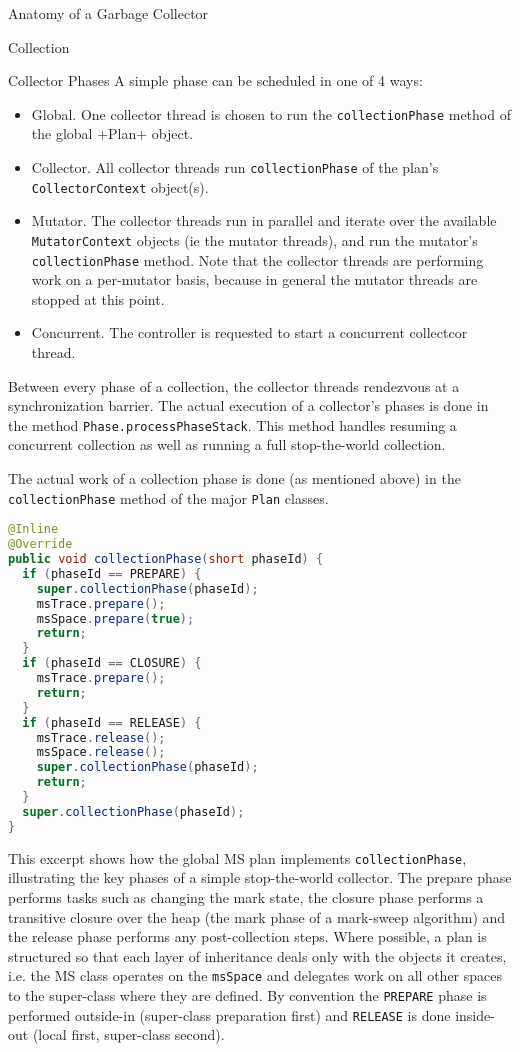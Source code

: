 \begin{section}{Anatomy of a Garbage Collector}
\begin{subsection}{Collection}
\begin{subsubsection}{Collector Phases}
A simple phase can be scheduled in one of 4 ways: 
\begin{itemize}
  \item Global.  One collector thread is chosen to run the \texttt{collectionPhase} method of the global \spverb+Plan+ object.
  \item Collector.  All collector threads run \texttt{collectionPhase} of the plan's \texttt{CollectorContext} object(s).
  \item Mutator.  The collector threads run in parallel and iterate over the available \texttt{MutatorContext} objects (ie the mutator threads), and run the mutator's \texttt{collectionPhase} method.  Note that the collector threads are performing work on a per-mutator basis, because in general the mutator threads are stopped at this point.
  \item Concurrent.  The controller is requested to start a concurrent collectcor thread.
\end{itemize}

Between every phase of a collection, the collector threads rendezvous at a synchronization barrier.  The actual execution of a collector's phases is done in the method \texttt{Pha\-se.pro\-cess\-Pha\-se\-Stack}.  This method handles resuming a concurrent collection as well as running a full stop-the-world collection.

The actual work of a collection phase is done (as mentioned above) in the \texttt{collectionPhase} method of the major \texttt{Plan} classes.

\begin{lstlisting}[language=Java,title=MS.java]
@Inline
@Override
public void collectionPhase(short phaseId) {
  if (phaseId == PREPARE) {
    super.collectionPhase(phaseId);
    msTrace.prepare();
    msSpace.prepare(true);
    return;
  }
  if (phaseId == CLOSURE) {
    msTrace.prepare();
    return;
  }
  if (phaseId == RELEASE) {
    msTrace.release();
    msSpace.release();
    super.collectionPhase(phaseId);
    return;
  }
  super.collectionPhase(phaseId);
}
\end{lstlisting}

This excerpt shows how the global MS plan implements \texttt{collectionPhase}, illustrating the key phases of a simple stop-the-world collector.  The prepare phase performs tasks such as changing the mark state, the closure phase performs a transitive closure over the heap (the mark phase of a mark-sweep algorithm) and the release phase performs any post-collection steps.  Where possible, a plan is structured so that each layer of inheritance deals only with the objects it creates, i.e. the MS class operates on the \texttt{msSpace} and delegates work on all other spaces to the super-class where they are defined.  By convention the \texttt{PREPARE} phase is performed outside-in (super-class preparation first) and \texttt{RELEASE} is done inside-out (local first, super-class second).


\end{subsubsection}
\end{subsection}
\end{section}

